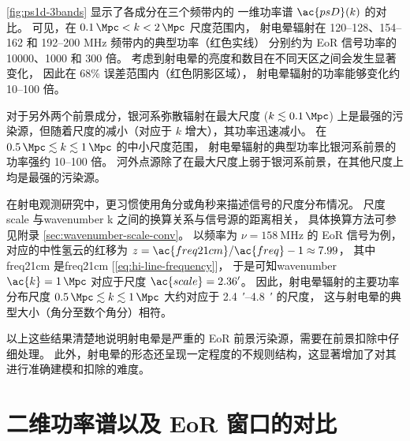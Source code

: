 \autoref{fig:ps1d-3bands} 显示了各成分在三个频带内的
一维功率谱 $\ac{psD}(k)$ 的对比。
可见，在 $\SI{0.1}{\per\Mpc} < k < \SI{2}{\per\Mpc}$ 尺度范围内，
射电晕辐射在 \numrange{120}{128}、\numrange{154}{162} 和
\numrange{192}{200} \si{\MHz} 频带内的典型功率（红色实线）
分别约为 EoR 信号功率的 \num{10000}、1000 和 300 倍。
考虑到射电晕的亮度和数目在不同天区之间会发生显著变化，
因此在 68\% 误差范围内（红色阴影区域），
射电晕辐射的功率能够变化约 \numrange{10}{100} 倍。

对于另外两个前景成分，银河系弥散辐射在最大尺度 ($k \lesssim \SI{0.1}{\per\Mpc}$)
上是最强的污染源，但随着尺度的减小（对应于 $k$ 增大），其功率迅速减小。
在 $\SI{0.5}{\per\Mpc} \lesssim k \lesssim \SI{1}{\per\Mpc}$
的中小尺度范围，
射电晕辐射的典型功率比银河系前景的功率强约 \numrange{10}{100} 倍。
河外点源除了在最大尺度上弱于银河系前景，在其他尺度上均是最强的污染源。

在射电观测研究中，更习惯使用角分或角秒来描述信号的尺度分布情况。
尺度 \ac{scale} 与\ac{wavenumber} \ac{k} 之间的换算关系与信号源的距离相关，
具体换算方法可参见附录 \autoref{sec:wavenumber-scale-conv}。
以频率为 $\nu = \SI{158}{\MHz}$ 的 EoR 信号为例，对应的中性氢云的红移为
$z = \ac{freq21cm} / \ac{freq} - 1 \approx 7.99$，
其中 \ac{freq21cm} 是\acl{freq21cm} [\autoref{eq:hi-line-frequency}]，
于是可知\ac{wavenumber} $\ac{k} = \SI{1}{\per\Mpc}$
对应于尺度 $\ac{scale} = \SI{2.36}{\arcminute}$。
因此，射电晕辐射的主要功率分布尺度
$\SI{0.5}{\per\Mpc} \lesssim k \lesssim \SI{1}{\per\Mpc}$
大约对应于 \SIrange[range-units=repeat]{2.4}{4.8}{\arcminute} 的尺度，
这与射电晕的典型大小（角分至数个角分）相符。

以上这些结果清楚地说明射电晕是严重的 EoR 前景污染源，需要在前景扣除中仔细处理。
此外，射电晕的形态还呈现一定程度的不规则结构，这显著增加了对其进行准确建模和扣除的难度。


\section{二维功率谱以及 EoR 窗口的对比}
\label{sec:ps2d}

